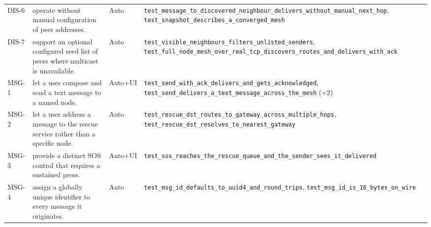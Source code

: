 \begin{longtable}{@{}p{0.95cm}p{6.6cm}p{1.15cm}p{8.6cm}@{}}
DIS-6 & operate without manual configuration of peer addresses. & Auto & \texttt{test\_\allowbreak{}message\_\allowbreak{}to\_\allowbreak{}discovered\_\allowbreak{}neighbour\_\allowbreak{}delivers\_\allowbreak{}without\_\allowbreak{}manual\_\allowbreak{}next\_\allowbreak{}hop}, \texttt{test\_\allowbreak{}snapshot\_\allowbreak{}describes\_\allowbreak{}a\_\allowbreak{}converged\_\allowbreak{}mesh} \\
DIS-7 & support an optional configured seed list of peers where multicast is unavailable. & Auto & \texttt{test\_\allowbreak{}visible\_\allowbreak{}neighbours\_\allowbreak{}filters\_\allowbreak{}unlisted\_\allowbreak{}senders}, \texttt{test\_\allowbreak{}full\_\allowbreak{}node\_\allowbreak{}mesh\_\allowbreak{}over\_\allowbreak{}real\_\allowbreak{}tcp\_\allowbreak{}discovers\_\allowbreak{}routes\_\allowbreak{}and\_\allowbreak{}delivers\_\allowbreak{}with\_\allowbreak{}ack} \\
MSG-1 & let a user compose and send a text message to a named node. & Auto+UI & \texttt{test\_\allowbreak{}send\_\allowbreak{}with\_\allowbreak{}ack\_\allowbreak{}delivers\_\allowbreak{}and\_\allowbreak{}gets\_\allowbreak{}acknowledged}, \texttt{test\_\allowbreak{}send\_\allowbreak{}delivers\_\allowbreak{}a\_\allowbreak{}text\_\allowbreak{}message\_\allowbreak{}across\_\allowbreak{}the\_\allowbreak{}mesh} (+2) \\
MSG-2 & let a user address a message to the rescue service rather than a specific node. & Auto & \texttt{test\_\allowbreak{}rescue\_\allowbreak{}dst\_\allowbreak{}routes\_\allowbreak{}to\_\allowbreak{}gateway\_\allowbreak{}across\_\allowbreak{}multiple\_\allowbreak{}hops}, \texttt{test\_\allowbreak{}rescue\_\allowbreak{}dst\_\allowbreak{}resolves\_\allowbreak{}to\_\allowbreak{}nearest\_\allowbreak{}gateway} \\
MSG-3 & provide a distinct SOS control that requires a sustained press. & Auto+UI & \texttt{test\_\allowbreak{}sos\_\allowbreak{}reaches\_\allowbreak{}the\_\allowbreak{}rescue\_\allowbreak{}queue\_\allowbreak{}and\_\allowbreak{}the\_\allowbreak{}sender\_\allowbreak{}sees\_\allowbreak{}it\_\allowbreak{}delivered} \\
MSG-4 & assign a globally unique identifier to every message it originates. & Auto & \texttt{test\_\allowbreak{}msg\_\allowbreak{}id\_\allowbreak{}defaults\_\allowbreak{}to\_\allowbreak{}uuid4\_\allowbreak{}and\_\allowbreak{}round\_\allowbreak{}trips}, \texttt{test\_\allowbreak{}msg\_\allowbreak{}id\_\allowbreak{}is\_\allowbreak{}16\_\allowbreak{}bytes\_\allowbreak{}on\_\allowbreak{}wire} \\

\end{longtable}
